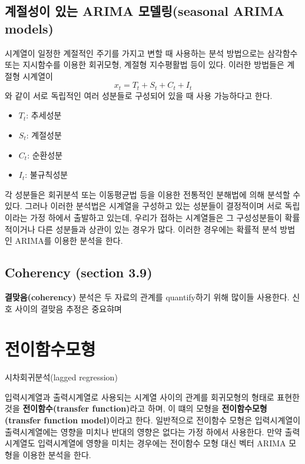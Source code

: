 \documentclass[b5paper,]{book}
\theoremstyle{definition}
\theoremstyle{definition}
\theoremstyle{definition}
\theoremstyle{remark}
\begin{document}
\section{계절성이 있는 ARIMA 모델링(seasonal ARIMA
models)}\label{--arima-seasonal-arima-models}

시계열이 일정한 계절적인 주기를 가지고 변할 때 사용하는 분석 방법으로는
삼각함수 또는 지시함수를 이용한 회귀모형, 계절형 지수평활법 등이 있다.
이러한 방법들은 계절형 시계열이 \[x_{t}=T_{t}+S_{t}+C_{t}+I_{t}\] 와
같이 서로 독립적인 여러 성분들로 구성되어 있을 때 사용 가능하다고 한다.

\begin{itemize}
\item
  \(T_{t}\): 추세성분
\item
  \(S_{t}\): 계절성분
\item
  \(C_{t}\): 순환성분
\item
  \(I_{t}\): 불규칙성분
\end{itemize}

각 성분들은 회귀분석 또는 이동평균법 등을 이용한 전통적인 분해법에 의해
분석할 수 있다. 그러나 이러한 분석법은 시계열을 구성하고 있는 성분들이
결정적이며 서로 독립이라는 가정 하에서 출발하고 있는데, 우리가 접하는
시계열들은 그 구성성분들이 확률적이거나 다른 성분들과 상관이 있는 경우가
많다. 이러한 경우에는 확률적 분석 방법인 ARIMA를 이용한 분석을 한다.

\section{Coherency (section 3.9)}\label{coherency-section-3.9}

\textbf{결맞음(coherency)} 분석은 두 자료의 관계를 quantify하기 위해
많이들 사용한다. 신호 사이의 결맞음 추정은 중요햐며

\chapter{전이함수모형}\label{transfer}

시차회귀분석(lagged regression)

입력시계열과 출력시계열로 사용되는 시계열 사이의 관계를 회귀모형의
형태로 표현한 것을 \textbf{전이함수(transfer function)}라고 하며, 이
떄의 모형을 \textbf{전이함수모형(transfer function model)}이라고 한다.
일반적으로 전이함수 모형은 입력시계열이 출력시계열에는 영향을 미치나
반대의 영향은 없다는 가정 하에서 사용한다. 만약 출력시계열도
입력시계열에 영향을 미치는 경우에는 전이함수 모형 대신 벡터 ARIMA 모형을
이용한 분석을 한다.
\end{document}
